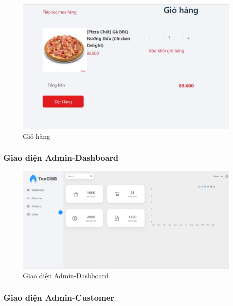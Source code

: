 \documentclass[a4paper]{article}
\begin{document}
\begin{figure}[!h]
    \begin{center}
        \includegraphics[scale=0.6]{Images/screen_flow/cart.jpg}
    \end{center}
    \hspace{0.3cm}
    \caption{Giỏ hàng}
\end{figure}
\newpage
\subsubsection{Giao diện Admin-Dashboard}

\begin{figure}[!h]
    \begin{center}
        \includegraphics[scale=0.4]{Images/screen_flow/dashboard.jpg}
    \end{center}
    \hspace{0.3cm}
    \caption{Giao diện Admin-Dashboard}
\end{figure}

\subsubsection{Giao diện Admin-Customer}
\end{document}
